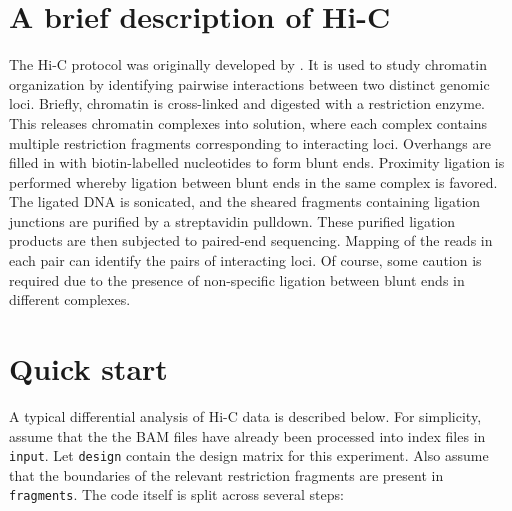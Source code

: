 \documentclass[12pt]{report}
\newcommand{\code}[1]{{\small\texttt{#1}}}
\begin{document}
\section{A brief description of Hi-C}
The Hi-C protocol was originally developed by \cite{lieberman2009comprehensive}.
It is used to study chromatin organization by identifying pairwise interactions between two distinct genomic loci.
Briefly, chromatin is cross-linked and digested with a restriction enzyme.
This releases chromatin complexes into solution, where each complex contains multiple restriction fragments corresponding to interacting loci.
Overhangs are filled in with biotin-labelled nucleotides to form blunt ends.
Proximity ligation is performed whereby ligation between blunt ends in the same complex is favored.
The ligated DNA is sonicated, and the sheared fragments containing ligation junctions are purified by a streptavidin pulldown.
These purified ligation products are then subjected to paired-end sequencing.
Mapping of the reads in each pair can identify the pairs of interacting loci.
Of course, some caution is required due to the presence of non-specific ligation between blunt ends in different complexes.

\section{Quick start}
A typical differential analysis of Hi-C data is described below.
For simplicity, assume that the the BAM files have already been processed into index files in \code{input}.
Let \code{design} contain the design matrix for this experiment.
Also assume that the boundaries of the relevant restriction fragments are present in \code{fragments}.
The code itself is split across several steps: 


\end{document}
